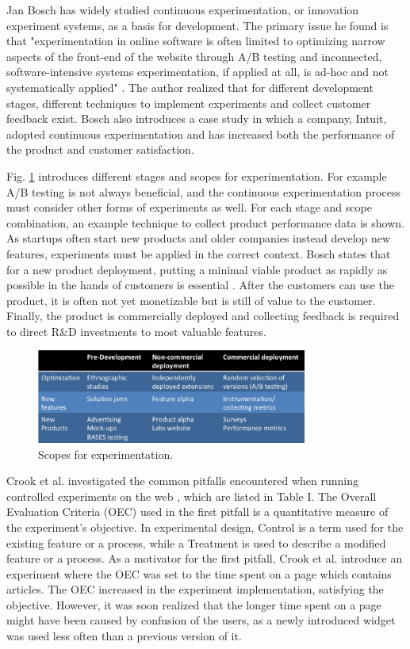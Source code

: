 \documentclass[conference]{IEEEtran}
\begin{document}
Jan Bosch has widely studied continuous experimentation, or innovation experiment systems, as a basis for development. The primary issue he found is that "experimentation in online software is often limited to optimizing narrow aspects of the front-end of the website through A/B testing and inconnected, software-intensive systems experimentation, if applied at all, is ad-hoc and not systematically applied" \cite{bosch2012building}. The author realized that for different development stages, different techniques to implement experiments and collect customer feedback exist. Bosch also introduces a case study in which a company, Intuit, adopted continuous experimentation and has increased both the performance of the product and customer satisfaction.

Fig. \ref{fig4} introduces different stages and scopes for experimentation. For example A/B testing is not always beneficial, and the continuous experimentation process must consider other forms of experiments as well. For each stage and scope combination, an example technique to collect product performance data is shown. As startups often start new products and older companies instead develop new features, experiments must be applied in the correct context. Bosch states that for a new product deployment, putting a minimal viable product as rapidly as possible in the hands of customers is essential \cite{bosch2012building}. After the customers can use the product, it is often not yet monetizable but is still of value to the customer. Finally, the product is commercially deployed and collecting feedback is required to direct R\&D investments to most valuable features.
\begin{figure}[H]
	\centering
	\includegraphics[width=3.5in]{bosch.jpg}
	\caption{Scopes for experimentation\cite{bosch2012building}.}
	\label{fig4}
\end{figure}
Crook et al. investigated the common pitfalls encountered when running controlled experiments on the web \cite{crook2009seven}, which are listed in Table I. The Overall Evaluation Criteria (OEC) used in the first pitfall is a quantitative measure of the experiment's objective. In experimental design, Control is a term used for the existing feature or a process, while a Treatment is used to describe a modified feature or a process. As a motivator for the first pitfall, Crook et al. introduce an experiment where the OEC was set to the time spent on a page which contains articles. The OEC increased in the experiment implementation, satisfying the objective. However, it was soon realized that the longer time spent on a page might have been caused by confusion of the users, as a newly introduced widget was used less often than a previous version of it. 
\end{document}
